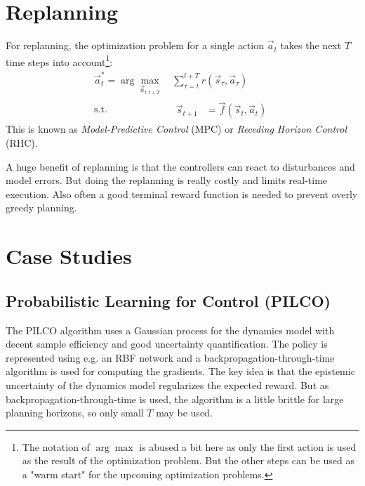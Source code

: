	\section{Replanning}
		\label{sec:mbrlReplanning}

		For replanning, the optimization problem for a single action \( \vec{a}_t \) takes the next \(T\) time steps into account\footnote{The notation of \(\arg\max\) is abused a bit here as only the first action is used as the result of the optimization problem. But the other steps can be used as a "warm start" for the upcoming optimization problems.}:
		\begin{equation*}
			\begin{aligned}
				\vec{a}_t^\ast = \arg\max_{\vec{a}_{t:t + T}} \,& \sum_{\tau = t}^{t + T} r(\vec{s}_\tau, \vec{a}_\tau) \\
				\mathrm{s.t.} \quad&
					\begin{aligned}
						\vec{s}_{t + 1} &= \vec{f}(\vec{s}_t, \vec{a}_t)
					\end{aligned}
			\end{aligned}
		\end{equation*}
		This is known as \emph{Model-Predictive Control} (MPC) or \emph{Receding Horizon Control} (RHC).

		A huge benefit of replanning is that the controllers can react to disturbances and model errors. But doing the replanning is really costly and limits real-time execution. Also often a good terminal reward function is needed to prevent overly greedy planning.

	\section{Case Studies}
		\subsection{Probabilistic Learning for Control (PILCO)}
			The PILCO algorithm uses a Gaussian process for the dynamics model with decent sample efficiency and good uncertainty quantification. The policy is represented using e.g. an RBF network and a backpropagation-through-time algorithm is used for computing the gradients. The key idea is that the epistemic uncertainty of the dynamics model regularizes the expected reward. But as backpropagation-through-time is used, the algorithm is a little brittle for large planning horizons, so only small \(T\) may be used.

